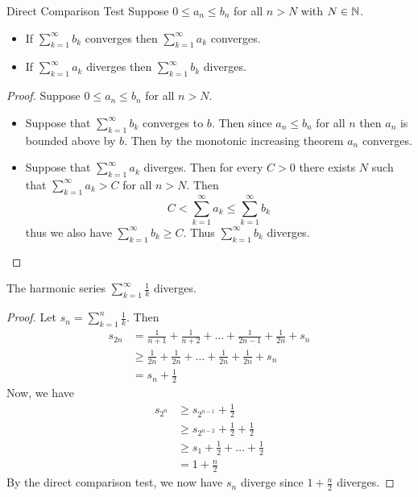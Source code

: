 \documentclass[a4paper]{article}
\begin{document}
\begin{thm}{Direct Comparison Test}{} Suppose $0\leq a_n\leq b_n$ for all $n>N$ with $N\in\mathbb{N}$.
\begin{itemize}
\item If $\sum_{k=1}^\infty b_k$ converges then $\sum_{k=1}^\infty a_k$ converges. 
\item If $\sum_{k=1}^\infty a_k$ diverges then $\sum_{k=1}^\infty b_k$ diverges. 
\end{itemize}\tcbline
\begin{proof} Suppose $0\leq a_n\leq b_n$ for all $n>N$. 
\begin{itemize}
\item Suppose that $\sum_{k=1}^\infty b_k$ converges to $b$. Then since $a_n\leq b_n$ for all $n$ then $a_n$ is bounded above by $b$. Then by the monotonic increasing theorem $a_n$ converges. 
\item Suppose that $\sum_{k=1}^\infty a_k$ diverges. Then for every $C>0$ there exists $N$ such that $\sum_{k=1}^\infty a_k>C$ for all $n>N$. Then $$C<\sum_{k=1}^\infty a_k\leq\sum_{k=1}^\infty b_k$$ thus we also have $\sum_{k=1}^\infty b_k\geq C$. Thus $\sum_{k=1}^\infty b_k$ diverges. 
\end{itemize}
\end{proof}
\end{thm}

\begin{lmm}{}{} The harmonic series $\sum_{k=1}^\infty\frac{1}{k}$ diverges. \tcbline
\begin{proof} Let $s_n=\sum_{k=1}^{n}\frac{1}{k}$. Then
\begin{align*}
s_{2n}&=\frac{1}{n+1}+\frac{1}{n+2}+\dots+\frac{1}{2n-1}+\frac{1}{2n}+s_n\\
&\geq\frac{1}{2n}+\frac{1}{2n}+\dots+\frac{1}{2n}+\frac{1}{2n}+s_n\\
&=s_n+\frac{1}{2}
\end{align*}
Now, we have 
\begin{align*}
s_{2^n}&\geq s_{2^{n-1}}+\frac{1}{2}\\
&\geq s_{2^{n-2}}+\frac{1}{2}+\frac{1}{2}\\
&\geq s_1+\frac{1}{2}+\dots+\frac{1}{2}\tag{$n$ times}\\
&=1+\frac{n}{2}
\end{align*}
By the direct comparison test, we now have $s_n$ diverge since $1+\frac{n}{2}$ diverges. 
\end{proof}
\end{lmm}
\end{document}
